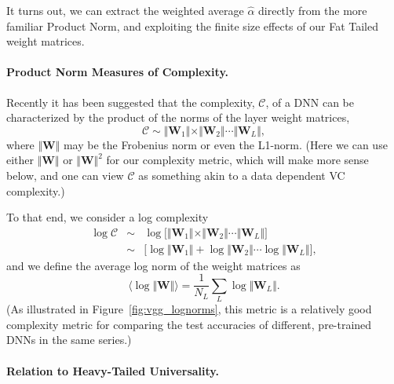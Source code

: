 It turns out, we can extract the weighted average $\hat{\alpha}$ directly from the more familiar Product Norm, and exploiting the finite size effects of our Fat Tailed weight matrices.


\paragraph{Product Norm Measures of Complexity.} 

Recently it has been suggested that the complexity, $\mathcal{C}$, of a DNN can be characterized by the product of the norms of the layer weight matrices,
$$
\mathcal{C}\sim\Vert\mathbf{W}_{1}\Vert\times\Vert\mathbf{W}_{2}\Vert\cdots\Vert\mathbf{W}_{L}\Vert ,
$$
where $\Vert\mathbf{W}\Vert$ may be the Frobenius norm or even the L1-norm. 
(Here we can use either $\Vert\mathbf{W}\Vert$ or $\Vert\mathbf{W}\Vert^{2}$ for our complexity metric, which will make more sense below, and one can view $\mathcal{C}$ as something akin to a data dependent VC complexity.)

To that end, we consider a log complexity
\begin{eqnarray*}
\log\mathcal{C} &\sim& \log\bigg[\Vert\mathbf{W}_{1}\Vert\times\Vert\mathbf{W}_{2}\Vert\cdots\Vert\mathbf{W}_{L}\Vert\bigg]  \\
                &\sim& \bigg[\log\Vert\mathbf{W}_{1}\Vert+\log\Vert\mathbf{W}_{2}\Vert\cdots\log\Vert\mathbf{W}_{L}\Vert\bigg]  ,
\end{eqnarray*}
and we define the average log norm of the weight matrices as
$$
\langle\log\Vert\mathbf{W}\Vert\rangle=\dfrac{1}{N_{L}}\sum_{L}\log\Vert\mathbf{W}_{L}\Vert  .
$$
(As illustrated in Figure~\ref{fig:vgg_lognorms}, this metric is a relatively good complexity metric for comparing the test accuracies of different, pre-trained DNNs in the same series.)


\paragraph{Relation to Heavy-Tailed Universality.} 

